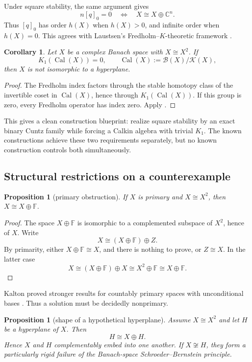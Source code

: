 \documentclass[11pt]{article}
\newtheorem{proposition}[theorem]{Proposition}
\newtheorem{corollary}[theorem]{Corollary}
\theoremstyle{definition}
\theoremstyle{remark}
\newcommand{\F}{\mathbb F}
\newcommand{\K}{\mathcal K}
\newcommand{\B}{\mathcal B}
\newcommand{\Cal}{\operatorname{Cal}}
\begin{document}
Under square stability, the same argument gives
\[
 n[q]_0=0\quad\Longleftrightarrow\quad X\cong X\oplus\mathbb C^n.
\]
Thus $[q]_0$ has order $h(X)$ when $h(X)>0$, and infinite order when
$h(X)=0$.  This agrees with Laustsen's Fredholm--$K$-theoretic framework
\cite{Laustsen1999}.

\begin{corollary}\label{cor:calkin-k1}
Let $X$ be a complex Banach space with $X\cong X^2$.  If
\[
 K_1(\Cal(X))=0,
 \qquad \Cal(X):=\B(X)/\K(X),
\]
then $X$ is not isomorphic to a hyperplane.
\end{corollary}

\begin{proof}
The Fredholm index factors through the stable homotopy class of the invertible
coset in $\Cal(X)$, hence through $K_1(\Cal(X))$.  If this group is zero, every
Fredholm operator has index zero.  Apply .
\end{proof}

This gives a clean construction blueprint: realize square stability by an exact
binary Cuntz family while forcing a Calkin algebra with trivial $K_1$.  The
known constructions achieve these two requirements separately, but no known
construction controls both simultaneously.

\subsection{Structural restrictions on a counterexample}

\begin{proposition}[primary obstruction]\label{prop:primary}
If $X$ is primary and $X\cong X^2$, then $X\cong X\oplus\F$.
\end{proposition}

\begin{proof}
The space $X\oplus\F$ is isomorphic to a complemented subspace of $X^2$, hence
of $X$.  Write
\[
 X\cong (X\oplus\F)\oplus Z.
\]
By primarity, either $X\oplus\F\cong X$, and there is nothing to prove, or
$Z\cong X$.  In the latter case
\[
 X\cong(X\oplus\F)\oplus X\cong X^2\oplus\F\cong X\oplus\F.
\]
\end{proof}

Kalton proved stronger results for countably primary spaces with unconditional
bases \cite{Kalton1999}.  Thus a solution must be decidedly nonprimary.

\begin{proposition}[shape of a hypothetical hyperplane]\label{prop:hyperplane-shape}
Assume $X\cong X^2$ and let $H$ be a hyperplane of $X$.  Then
\[
 H\cong X\oplus H.
\]
Hence $X$ and $H$ complementably embed into one another.  If $X\not\cong H$,
they form a particularly rigid failure of the Banach-space
Schroeder--Bernstein principle.
\end{proposition}
\end{document}
